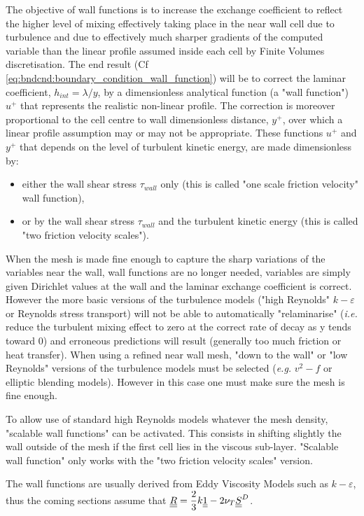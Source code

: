 The objective of wall functions
is to increase the exchange coefficient
 to reflect the higher level of mixing effectively taking place in the near wall cell due to
turbulence and due to effectively much sharper gradients of the computed variable than the
linear profile assumed inside each cell by Finite Volumes discretisation. The end result (Cf \eqref{eq:bndcnd:boundary_condition_wall_function}) will
be to correct the laminar coefficient, $h_{int} = \lambda / y $, by a dimensionless analytical function (a
"wall function") $u^+$ that represents the realistic non-linear profile. The correction is moreover
proportional to the cell centre to wall dimensionless distance, $y^+$, over which a linear profile
assumption may or may not be appropriate.
These functions $u^+$ and $y^+$ that depends on the level of turbulent kinetic energy,
are made dimensionless by:
\begin{itemize}
\item either the wall shear stress $\tau_{wall}$ only (this is called "one scale friction velocity" wall function),
\item or by the wall shear stress $\tau_{wall}$ and the turbulent kinetic energy (this is called "two friction velocity scales").
\end{itemize}

When the mesh is made fine enough to capture the sharp variations of the variables near the
wall, wall functions are no longer needed, variables are simply given Dirichlet values at the
wall and the laminar exchange coefficient is correct. However the more basic versions of the
turbulence models ("high Reynolds" $k-\varepsilon$ or Reynolds stress transport) will not be able to
automatically "relaminarise" (\emph{i.e.} reduce the turbulent mixing effect to zero at the correct rate
of decay as y tends toward $0$) and erroneous predictions will result (generally too much friction
or heat transfer).
When using a refined near wall mesh, "down to the wall" or "low Reynolds" versions of the
turbulence models must be selected (\emph{e.g.} $v^2-f$ or elliptic blending models). However in this
case one must make sure the mesh is fine enough.

To allow use of standard high Reynolds models whatever the mesh density,
"scalable wall functions" can be activated. This consists in shifting slightly the
wall outside of the mesh if the first cell lies in the viscous sub-layer. "Scalable wall function"
only works with the "two friction velocity scales" version.

The wall functions are usually derived from Eddy Viscosity Models such as $k-\varepsilon$, thus the coming sections
assume that $\underline{\underline{R}} = \dfrac{2}{3}k \underline{\underline{1}} - 2\nu_T \underline{\underline{S}}^D$.


